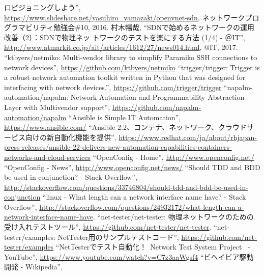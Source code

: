 \begin{thebibliography}{99}
         ロビジョニングしよう'',
         \url{https://www.slideshare.net/yasuhiro_yamazaki/openvnet-sdn},
         ネットワークプログラマビリティ勉強会\#10, 2016.
         村木暢哉, ``SDNで始めるネットワークの運用改善（2）：SDNで物理ネッ
         トワークのテストを楽にする方法 (1/4) - ＠IT'',
         \url{http://www.atmarkit.co.jp/ait/articles/1612/27/news014.html},
         @IT, 2017.
         ``ktbyers/netmiko: Multi-vendor library to simplify Paramiko SSH connections to network devices'',
         \url{https://github.com/ktbyers/netmiko}
         ``trigger/trigger: Trigger is a robust network automation toolkit written in Python that was designed for interfacing with network devices.'',
         \url{https://github.com/trigger/trigger}
         ``napalm-automation/napalm: Network Automation and Programmability Abstraction Layer with Multivendor support'',
         \url{https://github.com/napalm-automation/napalm}
         ``Ansible is Simple IT Automation'',
         \url{https://www.ansible.com/}
         ``Ansible 2.2、コンテナ、ネットワーク、クラウドサービス向けの新自動化機能を提供'',
         \url{https://www.redhat.com/ja/about/rhjapan-press-releases/ansible-22-delivers-new-automation-capabilities-containers-networks-and-cloud-services}
         ``OpenConfig - Home'',
         \url{http://www.openconfig.net/}
         ``OpenConfig - News'',
         \url{http://www.openconfig.net/news/}
         ``Should TDD and BDD be used in conjunction? - Stack Overflow'',
         \url{http://stackoverflow.com/questions/33746804/should-tdd-and-bdd-be-used-in-conjunction}
         ``linux - What length can a network interface name have? -
         Stack Overflow'',
         \url{http://stackoverflow.com/questions/24932172/what-length-can-a-network-interface-name-have}.
         ``net-tester/net-tester: 物理ネットワークのための受け入れテストツール'',
         \url{https://github.com/net-tester/net-tester}.
         ``net-tester/examples: NetTester用のサンプルテストコード'',
         \url{https://github.com/net-tester/examples}
         ``NetTesterでテスト自動化！~Network Test System Project~ - YouTube'',
         \url{https://www.youtube.com/watch?v=C7z3aaWgsf4}
         ``ビヘイビア駆動開発 - Wikipedia'',

\end{thebibliography}
